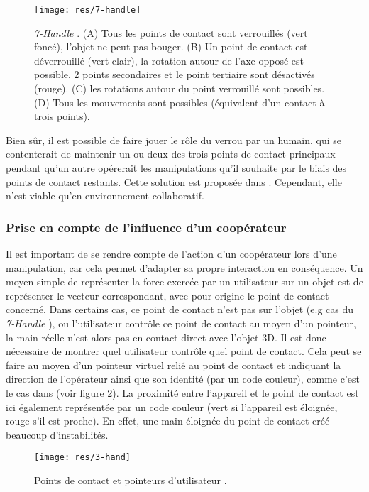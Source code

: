 \documentclass[11pt]{article}
\begin{document}
\begin{figure}[!h]
\centering
\texttt{[image: res/7-handle]}
\caption{\label{fig:7-handler}\textit{7-Handle} \cite{thesis}. (A) Tous les points de contact sont verrouillés (vert foncé), l'objet ne peut pas bouger. (B) Un point de contact est déverrouillé (vert clair), la rotation autour de l'axe opposé est possible. 2 points secondaires et le point tertiaire sont désactivés (rouge). (C) les rotations autour du point verrouillé sont possibles. (D) Tous les mouvements sont possibles (équivalent d'un contact à trois points).}
\end{figure}

Bien sûr, il est possible de faire jouer le rôle du verrou par un humain, qui se contenterait de maintenir un ou deux des trois points de contact principaux pendant qu'un autre opérerait les manipulations qu'il souhaite par le biais des points de contact restants. Cette solution est proposée dans \cite{3-hand}. Cependant, elle n'est viable qu'en environnement collaboratif.

\subsubsection{Prise en compte de l'influence d'un coopérateur}
Il est important de se rendre compte de l'action d'un coopérateur lors d'une manipulation, car cela permet d'adapter sa propre interaction en conséquence. Un moyen simple de représenter la force exercée par un utilisateur sur un objet est de représenter le vecteur correspondant, avec pour origine le point de contact concerné. Dans certains cas, ce point de contact n'est pas sur l'objet (e.g cas du \textit{7-Handle} \cite{thesis}), ou l'utilisateur contr\^ole ce point de contact au moyen d'un pointeur, la main réelle n'est alors pas en contact direct avec l'objet 3D. Il est donc nécessaire de montrer quel utilisateur contr\^ole quel point de contact. Cela peut se faire au moyen d'un pointeur virtuel relié au point de contact et indiquant la direction de l'opérateur ainsi que son identité (par un code couleur), comme c'est le cas dans \cite{3-hand} (voir figure \ref{fig:3-hand}). La proximité entre l'appareil et le point de contact est ici également représentée par un code couleur (vert si l'appareil est éloignée, rouge s'il est proche). En effet, une main éloignée du point de contact créé beaucoup d'instabilités. 

\begin{figure}
\centering
\texttt{[image: res/3-hand]}
\caption{\label{fig:3-hand}Points de contact et pointeurs d'utilisateur \cite{3-hand}.}
\end{figure}
\end{document}
